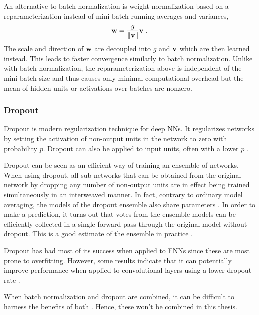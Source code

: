 An alternative to batch normalization is weight normalization \cite{Salimans2016a} based on a reparameterization instead of mini-batch running averages and variances,
\begin{equation}
    {\mathbf{w}} = \frac{g}{{\left\lVert{\mathbf{v}}\right\rVert}}{\mathbf{v}} \ .
\end{equation}
The scale and direction of ${\mathbf{w}}$ are decoupled into $g$ and ${\mathbf{v}}$ which are then learned instead. This leads to faster convergence similarly to batch normalization. Unlike with batch normalization, the reparameterization above is independent of the mini-batch size and thus causes only minimal computational overhead but the mean of hidden units or activations over batches are nonzero.


\subsubsection{Dropout}
Dropout \cite{Hinton2012a, Srivastava2014} is modern regularization technique for deep \glspl{NN}. It regularizes networks by setting the activation of non-output units in the network to zero with probability $p$. Dropout can also be applied to input units, often with a lower $p$ \cite{Goodfellow2016}.

Dropout can be seen as an efficient way of training an ensemble of networks. When using dropout, all sub-networks that can be obtained from the original network by dropping any number of non-output units are in effect being trained simultaneously in an interweaved manner. In fact, contrary to ordinary model averaging, the models of the dropout ensemble also share parameters \cite{Goodfellow2016}. In order to make a prediction, it turns out that votes from the ensemble models can be efficiently collected in a single forward pass through the original model without dropout. This is a good estimate of the ensemble in practice \cite{Hinton2012a}.

Dropout has had most of its success when applied to \glspl{FNN} since these are most prone to overfitting. However, some results indicate that it can potentially improve performance when applied to convolutional layers using a lower dropout rate \cite{Park2017}.

When batch normalization and dropout are combined, it can be difficult to harness the benefits of both \cite{Li2018}. Hence, these won't be combined in this thesis.

